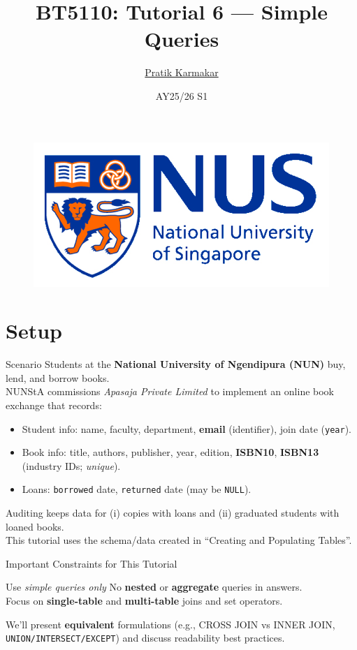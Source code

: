 \documentclass{beamer}
\author{\href{https://pratik2358.github.io/}{Pratik Karmakar}}
\title{BT5110: Tutorial 6 — Simple Queries}
\institute{
  School of Computing,\\
  National University of Singapore
}
\date{AY25/26 S1}
\begin{document}
\begin{frame}
  \titlepage
  \begin{figure}[htpb]
    \begin{center}
      \includegraphics[keepaspectratio, scale=0.18]{nus-logo.png}
    \end{center}
  \end{figure}
\end{frame}

\section{Setup}
\begin{frame}{Scenario}
\small
Students at the \textbf{National University of Ngendipura (NUN)} buy, lend, and borrow books.\\
NUNStA commissions \emph{Apasaja Private Limited} to implement an online book exchange that records:
\begin{itemize}\itemsep3pt
  \item Student info: name, faculty, department, \textbf{email} (identifier), join date (\texttt{year}).
  \item Book info: title, authors, publisher, year, edition, \textbf{ISBN10}, \textbf{ISBN13} (industry IDs; \emph{unique}).
  \item Loans: \texttt{borrowed} date, \texttt{returned} date (may be \texttt{NULL}).
\end{itemize}
Auditing keeps data for (i) copies with loans and (ii) graduated students with loaned books. \\
This tutorial uses the schema/data created in “Creating and Populating Tables”.
\end{frame}

\begin{frame}{Important Constraints for This Tutorial}
\Large
\begin{block}{Use \emph{simple queries only}}
No \textbf{nested} or \textbf{aggregate} queries in answers. \\
Focus on \textbf{single-table} and \textbf{multi-table} joins and set operators.
\end{block}
\normalsize
We’ll present \textbf{equivalent} formulations (e.g., CROSS JOIN vs INNER JOIN, \texttt{UNION/INTERSECT/EXCEPT}) and discuss readability best practices.
\end{frame}
\end{document}
